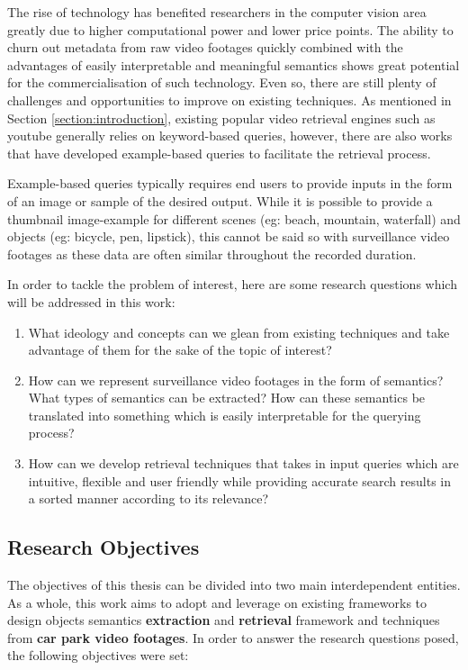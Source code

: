 The rise of technology has benefited researchers in the computer vision area greatly due to higher computational power and lower price points. The ability to churn out metadata from raw video footages quickly combined with the advantages of easily interpretable and meaningful semantics shows great potential for the commercialisation of such technology. Even so, there are still plenty of challenges and opportunities to improve on existing techniques. As mentioned in Section \ref{section:introduction}, existing popular video retrieval engines such as youtube generally relies on keyword-based queries, however, there are also works that have developed example-based queries \cite{zhang2017car, liu2016large, castanon2016retrieval} to facilitate the retrieval process.

Example-based queries typically requires end users to provide inputs in the form of an image or sample of the desired output. While it is possible to provide a thumbnail image-example for different scenes (eg: beach, mountain, waterfall) and objects (eg: bicycle, pen, lipstick), this cannot be said so with surveillance video footages as these data are often similar throughout the recorded duration.

In order to tackle the problem of interest, here are some research questions which will be addressed in this work:
\begin{enumerate}
\item What ideology and concepts can we glean from existing techniques and take advantage of them for the sake of the topic of interest?
\item How can we represent surveillance video footages in the form of semantics? What types of semantics can be extracted? How can these semantics be translated into something which is easily interpretable for the querying process?
\item How can we develop retrieval techniques that takes in input queries which are intuitive, flexible and user friendly while providing accurate search results in a sorted manner according to its relevance?
\end{enumerate}



\subsection{Research Objectives}
The objectives of this thesis can be divided into two main interdependent entities. As a whole, this work aims to adopt and leverage on existing frameworks to design objects semantics \textbf{extraction} and \textbf{retrieval} framework and techniques from \textbf{car park video footages}. In order to answer the research questions posed, the following objectives were set:

